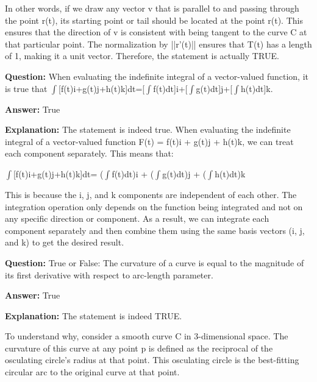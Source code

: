 \documentclass{article}
\begin{document}
In other words, if we draw any vector v that is parallel to and passing through the point r(t), its starting point or tail should be located at the point r(t). This ensures that the direction of v is consistent with being tangent to the curve C at that particular point. The normalization by ||r'(t)|| ensures that T(t) has a length of 1, making it a unit vector. Therefore, the statement is actually TRUE.
                
                \vspace{0.5cm} 
        
            
                \textbf {Question:} When evaluating the indefinite integral of a vector-valued function, it is true that \ensuremath{\int}[f(t)i+g(t)j+h(t)k]dt=[\ensuremath{\int}f(t)dt]i+[\ensuremath{\int}g(t)dt]j+[\ensuremath{\int}h(t)dt]k.
                
                \textbf{Answer:} True

                \textbf{Explanation:} The statement is indeed true. When evaluating the indefinite integral of a vector-valued function F(t) = f(t)i + g(t)j + h(t)k, we can treat each component separately. This means that:

\ensuremath{\int}[f(t)i+g(t)j+h(t)k]dt= (\ensuremath{\int}f(t)dt)i + (\ensuremath{\int}g(t)dt)j + (\ensuremath{\int}h(t)dt)k

This is because the i, j, and k components are independent of each other. The integration operation only depends on the function being integrated and not on any specific direction or component. As a result, we can integrate each component separately and then combine them using the same basis vectors (i, j, and k) to get the desired result.
                
                \vspace{0.5cm} 
        
            
                \textbf {Question:} True or False: The curvature of a curve is equal to the magnitude of its first derivative with respect to arc-length parameter.
                
                \textbf{Answer:} True

                \textbf{Explanation:} The statement is indeed TRUE. 

To understand why, consider a smooth curve C in 3-dimensional space. The curvature of this curve at any point p is defined as the reciprocal of the osculating circle's radius at that point. This osculating circle is the best-fitting circular arc to the original curve at that point.
\end{document}
